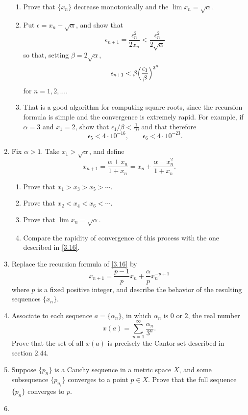 \begin{enumerate}
\begin{enumerate}[label = (\alph*)]
  \item
    Prove that \(\{x_n\}\) decrease monotonically and the
    \(\lim x_n = \sqrt{\alpha}\).
  \item
    Put \(\epsilon = x_n - \sqrt{\alpha}\), and show that
    \[
    \epsilon_{n + 1} = \frac{\epsilon_n^2}{2x_n} <
    \frac{\epsilon_n^2}{2\sqrt{\alpha}}
    \]
    so that, setting \(\beta = 2\sqrt{\alpha}\),
    \[
    \epsilon_{n + 1} < \beta\Bigl(\frac{\epsilon_1}{\beta}\Bigr)^{2^n}
    \]
    for \(n = 1,2,\ldots\).
  \item
    That is a good algorithm for computing square roots, since the recursion
    formula is simple and the convergence is extremely rapid.
    For example, if \(\alpha = 3\) and \(x_1 = 2\), show that
    \(\epsilon_1/\beta < \frac{1}{10}\) and that therefore
    \[
    \epsilon_5 < 4\cdot 10^{-16},\qquad\epsilon_6 < 4\cdot 10^{-23}.
    \]
  \end{enumerate}
\item
  Fix \(\alpha > 1\).
  Take \(x_1 > \sqrt{\alpha}\), and define
  \[
  x_{n + 1} = \frac{\alpha + x_n}{1 + x_n} = x_n +
  \frac{\alpha - x_n^2}{1 + x_n}.
  \]
  \begin{enumerate}[label = (\alph*)]
  \item
    Prove that \(x_1 > x_3 > x_5 > \cdots\).
  \item
    Prove that \(x_2 < x_4 < x_6 < \cdots\).
  \item
    Prove that \(\lim x_n = \sqrt{\alpha}\).
  \item
    Compare the rapidity of convergence of this process with the one described
    in \cref{3.16}.
  \end{enumerate}
\item
  Replace the recursion formula of \cref{3.16} by
  \[
  x_{n + 1} = \frac{p - 1}{p}x_n + \frac{\alpha}{p}x_n^{-p + 1}
  \]
  where \(p\) is a fixed positive integer, and describe the behavior of the
  resulting sequences \(\{x_n\}\).
\item
  Associate to each sequence \(a = \{\alpha_n\}\), in which \(\alpha_n\) is
  \(0\) or \(2\), the real number
  \[
  x(a) = \sum_{n = 1}^{\infty}\frac{\alpha_n}{3^n}.
  \]
  Prove that the set of all \(x(a)\) is precisely the Cantor set described in
  section \(2.44\).
\item
  Suppose \(\{p_n\}\) is a Cauchy sequence in a metric space \(X\), and some
  subsequence \(\{p_{n_i}\}\) converges to a point \(p\in X\).
  Prove that the full sequence \(\{p_n\}\) converges to \(p\).
\item

\end{enumerate}

